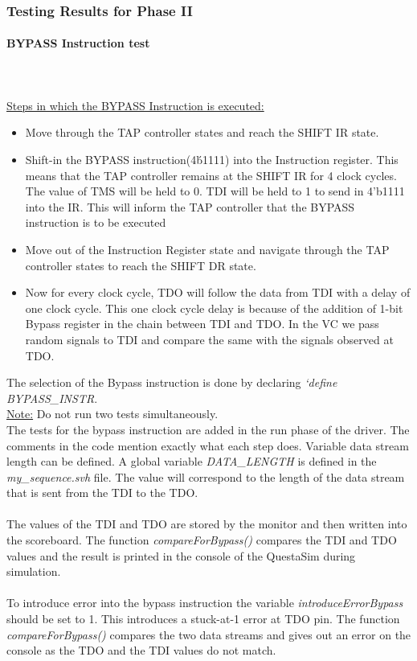\documentclass[a4paper,11pt]{article}
\begin{document}
\subsubsection{Testing Results for Phase II}

\paragraph{BYPASS Instruction test}\mbox{}\\
 \\\underline{Steps in which the BYPASS Instruction is executed:}
\begin{itemize}[noitemsep]
\item Move through the TAP controller states and reach the SHIFT IR state.
\item Shift-in the BYPASS instruction(4\'b1111) into the Instruction register. This means that the TAP controller remains at the SHIFT IR for 4 clock cycles. The value of TMS will be held to 0. TDI will be held to 1 to send in 4'b1111 into the IR. This will inform the TAP controller that the BYPASS instruction is to be executed
\item Move out of the Instruction Register state and navigate through the TAP controller states to reach the SHIFT DR state.
\item Now for every clock cycle, TDO will follow the data from TDI with a delay of one clock cycle. This one clock cycle delay is because of the addition of 1-bit Bypass register in the chain between TDI and TDO. In the VC we pass random signals to TDI and compare the same with the signals observed at TDO.
\end{itemize}

The selection of the Bypass instruction is done by declaring \textit{`define BYPASS\_INSTR}.\\ \underline{Note:} Do not run two tests simultaneously. \\
The tests for the bypass instruction are added in the run phase of the driver. The comments in the code mention exactly what each step does. Variable data stream length can be defined. A global variable \textit{DATA\_LENGTH} is defined in the \textit{my\_sequence.svh} file. The value will correspond to the length of the data stream that is sent from the TDI to the TDO. \\
 \\
The values of the TDI and TDO are stored by the monitor and then written into the scoreboard. The function \textit{compareForBypass()} compares the TDI and TDO values and the result is printed in the console of the QuestaSim during simulation. \\
 \\
 To introduce error into the bypass instruction the variable \textit{introduceErrorBypass} should be set to 1. This introduces a stuck-at-1 error at TDO pin. The function \textit{compareForBypass()} compares the two data streams and gives out an error on the console as the TDO and the TDI values do not match.\\
\end{document}
